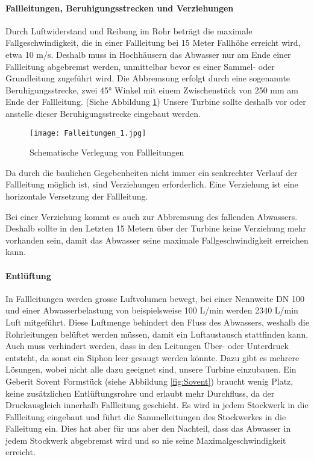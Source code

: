 \paragraph{Fallleitungen, Beruhigungsstrecken und Verziehungen}
Durch Luftwiderstand und Reibung im Rohr beträgt die maximale Fallgeschwindigkeit, die in einer Fallleitung bei 15 Meter Fallhöhe erreicht wird, etwa 10 m/s. Deshalb muss in Hochhäusern das Abwasser nur am Ende einer Fallleitung abgebremst werden, unmittelbar bevor es einer Sammel- oder Grundleitung zugeführt wird. Die Abbremsung erfolgt durch eine sogenannte Beruhigungsstrecke, zwei 45° Winkel mit einem Zwischenstück von 250 mm am Ende der Fallleitung. (Siehe Abbildung \ref{fig:Falleitungen}) Unsere Turbine sollte deshalb vor oder anstelle dieser Beruhigungsstrecke eingebaut werden.
\cite{baunetzwissen}

\begin{figure}[H]
	\centering
	\texttt{[image: Falleitungen\_1.jpg]}
	\caption{Schematische Verlegung von Fallleitungen \cite{baunetzwissen}}
	\label{fig:Falleitungen}
	
\end{figure}

Da durch die baulichen Gegebenheiten nicht immer ein senkrechter Verlauf der Fallleitung möglich ist, sind Verziehungen erforderlich. Eine Verziehung ist eine horizontale Versetzung der Fallleitung. \cite{docplayer}

Bei einer Verziehung kommt es auch zur Abbremsung des fallenden Abwassers. Deshalb sollte in den Letzten 15 Metern über der Turbine keine Verziehung mehr vorhanden sein, damit das Abwasser seine maximale Fallgeschwindigkeit erreichen kann.

\paragraph{Entlüftung}
In Fallleitungen werden grosse Luftvolumen bewegt, bei einer Nennweite DN 100 und einer Abwasserbelastung von beispielsweise 100 L/min werden 2340 L/min Luft mitgeführt.\cite{docplayer}
Diese Luftmenge behindert den Fluss des Abwassers, weshalb die Rohrleitungen belüftet werden müssen, damit ein Luftaustausch stattfinden kann. Auch muss verhindert werden, dass in den Leitungen Über- oder Unterdruck entsteht, da sonst ein Siphon leer gesaugt werden könnte. Dazu gibt es mehrere Lösungen, wobei nicht alle dazu geeignet sind, unsere Turbine einzubauen. Ein Geberit Sovent Formstück (siehe Abbildung \ref{fig:Sovent}) braucht wenig Platz, keine zusätzlichen Entlüftungsrohre und erlaubt mehr Durchfluss, da der Druckausgleich innerhalb Fallleitung geschieht. Es wird in jedem Stockwerk in die Fallleitung eingebaut und führt die Sammelleitungen des Stockwerkes in die Falleitung ein. Dies hat aber für uns aber den Nachteil, dass das Abwasser in jedem Stockwerk abgebremst wird und so nie seine Maximalgeschwindigkeit erreicht.

